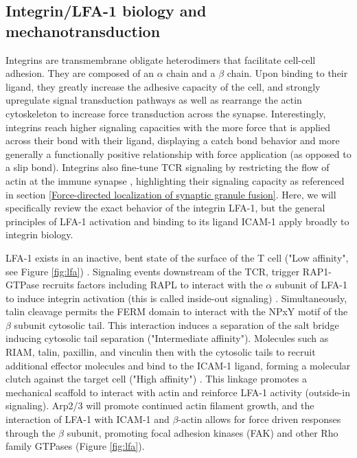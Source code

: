 \subsection{Integrin/LFA-1 biology and mechanotransduction}
\label{Integrin biology and mechanotransduction}
Integrins are transmembrane obligate heterodimers that facilitate cell-cell adhesion. They are composed of an $\alpha$ chain and a $\beta$ chain. Upon  binding to their ligand, they greatly increase the adhesive capacity of the cell, and strongly upregulate signal transduction pathways as well as rearrange the actin cytoskeleton to increase force transduction across the synapse. Interestingly, integrins reach higher signaling capacities with the more force that is applied across their bond with their ligand, displaying a catch bond behavior \cite{Chen2010} and more generally a functionally positive relationship with force application (as opposed to a slip bond). Integrins also fine-tune TCR signaling by restricting the flow of actin at the immune synapse \cite{Jankowska2018}, highlighting their signaling capacity as referenced in section \ref{Force-directed localization of synaptic granule fusion}. Here, we will specifically review the exact behavior of the integrin LFA-1, but the general principles of LFA-1 activation and binding to its ligand ICAM-1 apply broadly to integrin biology.

LFA-1 exists in an inactive, bent state of the surface of the T cell ("Low affinity", see Figure \ref{fig:lfa}) \cite{Comrie2015_2}. Signaling events downstream of the TCR, trigger RAP1-GTPase recruits factors including RAPL to interact with the $\alpha$ subunit of LFA-1 to induce integrin activation (this is called inside-out signaling) \cite{Walling2018}. Simultaneously, talin cleavage permits the FERM domain to interact with the NPxY motif of the $\beta$ subunit cytosolic tail. This interaction induces a separation of the salt bridge inducing cytosolic tail separation ("Intermediate affinity"). Molecules such as RIAM, talin, paxillin, and vinculin then with the cytosolic tails to recruit additional effector molecules and bind to the ICAM-1 ligand, forming a molecular clutch against the target cell ("High affinity") \cite{Comrie2015_2}. This linkage promotes a mechanical scaffold to interact with actin and reinforce LFA-1 activity (outside-in signaling). Arp2/3 will promote continued actin filament growth, and the interaction of LFA-1 with ICAM-1 and $\beta$-actin allows for force driven responses through the $\beta$ subunit, promoting focal adhesion kinases (FAK) and other Rho family GTPases (Figure \ref{fig:lfa}).

